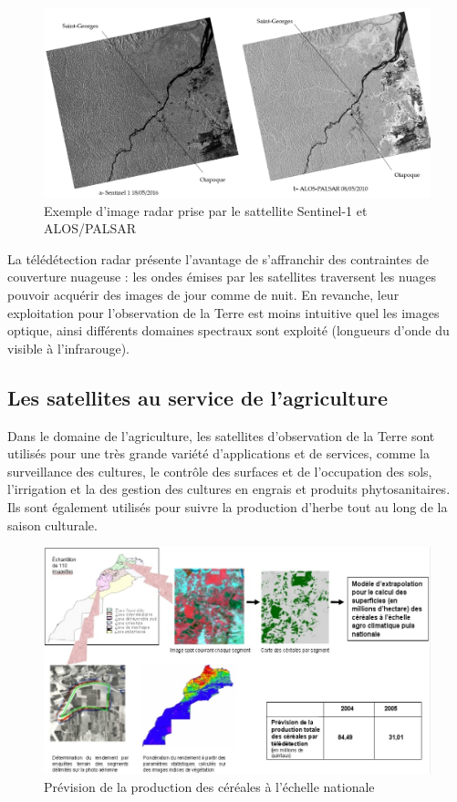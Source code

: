 \documentclass[12pt, openany]{report}
\begin{document}
\begin{figure}[H]
\centering
\includegraphics[scale=0.3]{image_radar.png}
\caption{Exemple d'image radar prise par le sattellite Sentinel-1 et ALOS/PALSAR}
\end{figure}

\par
La télédétection radar présente l’avantage de s’affranchir des contraintes de couverture nuageuse : les ondes émises par les satellites traversent les nuages pouvoir acquérir des images de jour comme de nuit. En revanche, leur exploitation pour l’observation de la Terre est moins intuitive quel les images optique, ainsi différents domaines spectraux sont exploité (longueurs d’onde du visible à l’infrarouge).\cite{ref4}



\subsection{Les satellites au service de l'agriculture}

Dans le domaine de l'agriculture, les satellites d'observation de la Terre sont utilisés pour une très grande variété d’applications et de services, comme la surveillance des cultures, le contrôle des surfaces et de l'occupation des sols, l'irrigation et la des gestion des cultures en engrais et produits phytosanitaires. Ils sont également utilisés pour suivre la production d'herbe tout au long de la saison culturale.  \cite{satt}


\begin{figure}[H]
\centering
\includegraphics[scale=0.7]{prev.jpg}
\caption{Prévision de la production des céréales à l'échelle nationale}
\end{figure}
\end{document}
